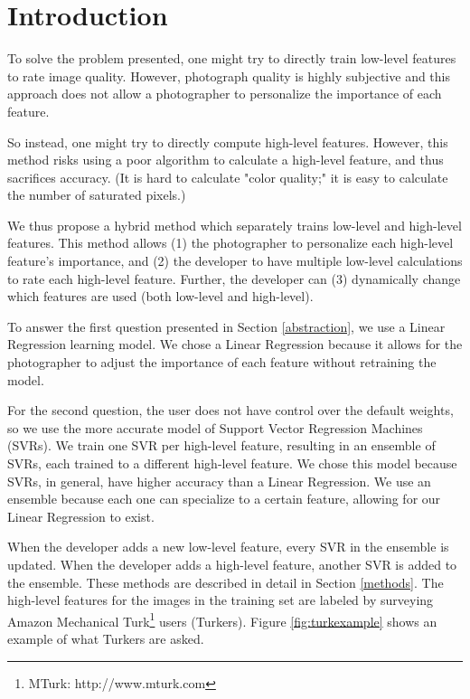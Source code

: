 \documentclass[11pt,letter]{article}
\begin{document}
\section{Introduction}
To solve the problem presented, one might try to directly train low-level features to rate image quality. However, photograph quality is highly subjective and this approach does not allow a photographer to personalize the importance of each feature.

So instead, one might try to directly compute high-level features. However, this method risks using a poor algorithm to calculate a high-level feature, and thus sacrifices accuracy. (It is hard to calculate "color quality;" it is easy to calculate the number of saturated pixels.)

We thus propose a hybrid method which separately trains low-level and high-level features. This method allows (1) the photographer to personalize each high-level feature's importance, and (2) the developer to have multiple low-level calculations to rate each high-level feature. Further, the developer can (3) dynamically change which features are used (both low-level and high-level).

To answer the first question presented in Section \ref{abstraction}, we use a Linear Regression learning model. We chose a Linear Regression because it allows for the photographer to adjust the importance of each feature without retraining the model.

For the second question, the user does not have control over the default weights, so we use the more accurate model of Support Vector Regression Machines (SVRs)\cite{springerlink:10.1023/B:STCO.0000035301.49549.88}. We train one SVR per high-level feature, resulting in an ensemble of SVRs, each trained to a different high-level feature. We chose this model because SVRs, in general, have higher accuracy than a Linear Regression. We use an ensemble because each one can specialize to a certain feature, allowing for our Linear Regression to exist. 

When the developer adds a new low-level feature, every SVR in the ensemble is updated. When the developer adds a high-level feature, another SVR is added to the ensemble. These methods are described in detail in Section \ref{methods}. The high-level features for the images in the training set are labeled by surveying Amazon Mechanical Turk\footnote{MTurk: http://www.mturk.com} users (Turkers). Figure \ref{fig:turkexample} shows an example of what Turkers are asked.
\end{document}
